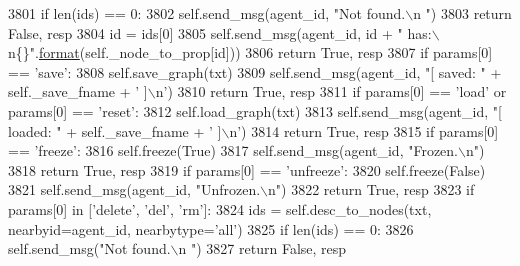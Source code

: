 \begin{DoxyCode}
3801             \textcolor{keywordflow}{if} len(ids) == 0:
3802                 self.send\_msg(agent\_id, \textcolor{stringliteral}{"Not found.\(\backslash\)n "})
3803                 \textcolor{keywordflow}{return} \textcolor{keyword}{False}, resp
3804             id = ids[0]
3805             self.send\_msg(agent\_id, id + \textcolor{stringliteral}{" has:\(\backslash\)n\{\}"}.\hyperlink{namespaceparlai_1_1chat__service_1_1services_1_1messenger_1_1shared__utils_a32e2e2022b824fbaf80c747160b52a76}{format}(self.\_node\_to\_prop[id]))
3806             \textcolor{keywordflow}{return} \textcolor{keyword}{True}, resp
3807         \textcolor{keywordflow}{if} params[0] == \textcolor{stringliteral}{'save'}:
3808             self.save\_graph(txt)
3809             self.send\_msg(agent\_id, \textcolor{stringliteral}{"[ saved: "} + self.\_save\_fname + \textcolor{stringliteral}{' ]\(\backslash\)n'})
3810             \textcolor{keywordflow}{return} \textcolor{keyword}{True}, resp
3811         \textcolor{keywordflow}{if} params[0] == \textcolor{stringliteral}{'load'} \textcolor{keywordflow}{or} params[0] == \textcolor{stringliteral}{'reset'}:
3812             self.load\_graph(txt)
3813             self.send\_msg(agent\_id, \textcolor{stringliteral}{"[ loaded: "} + self.\_save\_fname + \textcolor{stringliteral}{' ]\(\backslash\)n'})
3814             \textcolor{keywordflow}{return} \textcolor{keyword}{True}, resp
3815         \textcolor{keywordflow}{if} params[0] == \textcolor{stringliteral}{'freeze'}:
3816             self.freeze(\textcolor{keyword}{True})
3817             self.send\_msg(agent\_id, \textcolor{stringliteral}{"Frozen.\(\backslash\)n"})
3818             \textcolor{keywordflow}{return} \textcolor{keyword}{True}, resp
3819         \textcolor{keywordflow}{if} params[0] == \textcolor{stringliteral}{'unfreeze'}:
3820             self.freeze(\textcolor{keyword}{False})
3821             self.send\_msg(agent\_id, \textcolor{stringliteral}{"Unfrozen.\(\backslash\)n"})
3822             \textcolor{keywordflow}{return} \textcolor{keyword}{True}, resp
3823         \textcolor{keywordflow}{if} params[0] \textcolor{keywordflow}{in} [\textcolor{stringliteral}{'delete'}, \textcolor{stringliteral}{'del'}, \textcolor{stringliteral}{'rm'}]:
3824             ids = self.desc\_to\_nodes(txt, nearbyid=agent\_id, nearbytype=\textcolor{stringliteral}{'all'})
3825             \textcolor{keywordflow}{if} len(ids) == 0:
3826                 self.send\_msg(\textcolor{stringliteral}{"Not found.\(\backslash\)n "})
3827                 \textcolor{keywordflow}{return} \textcolor{keyword}{False}, resp

\end{DoxyCode}
